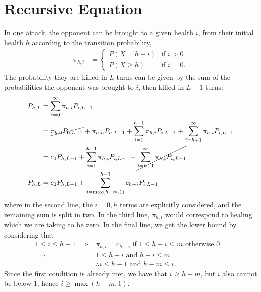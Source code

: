 	\section{Recursive Equation}
	In one attack, the opponent can be brought to a given health $i$, from their initial health $h$ according to the transition probability, \cite{nukelawe:osrs-markov}
	\begin{align}
		\pi_{h, i} &= \begin{cases}
			P(X=h - i) & \text{if } i > 0 \\
			P(X \ge h) & \text{if } i = 0.
	    \end{cases}
	\end{align}
	The probability they are killed in $L$ turns can be given by the sum of the probabilities the opponent was brought to $i$, then killed in $L - 1$ turns:
	\begin{align}
		P_{h, L} &= \sum_{i=0}^\infty \pi_{h, i} P_{i, L-1}\\
		&= \cancel{\pi_{h, 0} P_{0, L-1}} + \pi_{h, h} P_{h, L-1} + \sum_{i=1}^{h-1} \pi_{h, i} P_{i, L-1} + \sum_{i=h+1}^\infty \pi_{h, i} P_{i, L-1}\\
		&= c_0P_{h, L-1} + \sum_{i=1}^{h-1} \pi_{h, i} P_{i, L-1} + \cancel{\sum_{i=h+1}^\infty \pi_{h, i} P_{i, L-1}}\\
		P_{h, L} &= c_0P_{h, L-1} + \sum_{i=\max(h-m, 1)}^{h-1} c_{h-i} P_{i, L-1}\\
	\end{align}
	where in the second line, the $i=0, h$ terms are explicitly considered, and the remaining sum is split in two. In the third line, $\pi_{h, i}$ would correspond to healing which we are taking to be zero. In the final line, we get the lower bound by considering that 
	\begin{align}
		1\leq i \leq h-1 \implies& \pi_{h, i} = c_{h-i} \text{ if } 1\leq h - i \leq m \text{ otherwise } 0,\,\,\, \\
		\implies& 1\leq h - i \text{ and } h - i \leq m\\
		&\therefore  i\leq h - 1 \text{ and } h - m \leq i.
	\end{align}
	Since the first condition is already met, we have that $i \geq h - m$, but $i$ also cannot be below 1, hence $i\geq \max(h - m, 1)$. 



